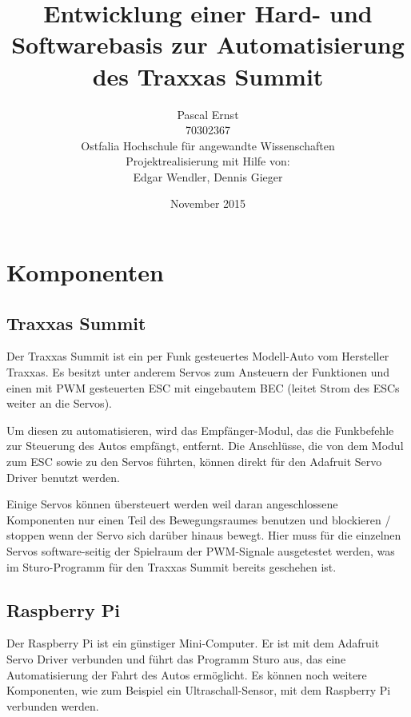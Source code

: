 \documentclass[a4paper,10pt]{scrartcl}
\begin{document}
\title{Entwicklung einer Hard- und Softwarebasis zur Automatisierung des Traxxas Summit}
\author{Pascal Ernst\\
  70302367 \\
  Ostfalia Hochschule für angewandte Wissenschaften \\
  Projektrealisierung mit Hilfe von: \\
  Edgar Wendler, Dennis Gieger}
\date{November 2015}
\maketitle

\newpage

\section{Komponenten}

  \subsection{Traxxas Summit}

    Der Traxxas Summit ist ein per Funk gesteuertes Modell-Auto vom Hersteller
    Traxxas.
    Es besitzt unter anderem Servos zum Ansteuern der Funktionen und einen mit
    PWM gesteuerten ESC mit eingebautem BEC (leitet Strom des ESCs weiter an die
    Servos).

    Um diesen zu automatisieren, wird das Empfänger-Modul, das die Funkbefehle
    zur Steuerung des Autos empfängt, entfernt.
    Die Anschlüsse, die von dem Modul zum ESC sowie zu den Servos führten,
    können direkt für den Adafruit Servo Driver benutzt werden.

    Einige Servos können übersteuert werden weil daran angeschlossene
    Komponenten nur einen Teil des Bewegungsraumes benutzen und blockieren /
    stoppen wenn der Servo sich darüber hinaus bewegt.
    Hier muss für die einzelnen Servos software-seitig der Spielraum der
    PWM-Signale ausgetestet werden, was im Sturo-Programm für den Traxxas Summit
    bereits geschehen ist.

  \subsection{Raspberry Pi}

    Der Raspberry Pi ist ein günstiger Mini-Computer.
    Er ist mit dem Adafruit Servo Driver verbunden und führt das Programm Sturo
    aus, das eine Automatisierung der Fahrt des Autos ermöglicht.
    Es können noch weitere Komponenten, wie zum Beispiel ein Ultraschall-Sensor,
    mit dem Raspberry Pi verbunden werden.
\end{document}
